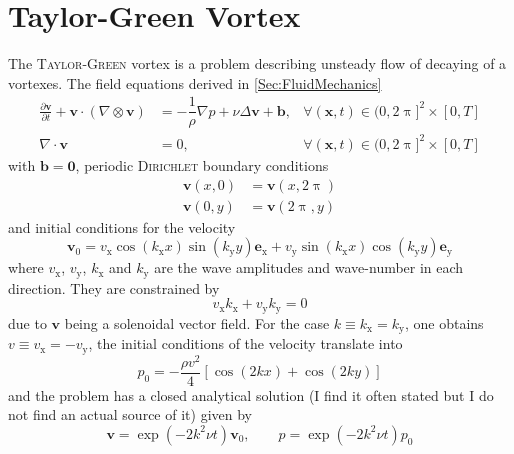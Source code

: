 \documentclass[]{scrartcl}
\newcommand{\pfrac}[2]{\frac{\partial #1}{\partial #2}}
\newcommand{\bs}[1]{\boldsymbol{#1}}
\begin{document}
\section{Taylor-Green Vortex}
The \textsc{Taylor-Green} vortex is a problem describing unsteady flow of decaying of a vortexes. The field equations derived in \cref{Sec:FluidMechanics}
\begin{equation*}
	\begin{aligned}
		\pfrac{\bs{v}}{t} + \bs{v} \cdot (\nabla \otimes \bs{v})&=  - \dfrac{1}{\rho}\nabla p + \nu \Delta \bs{v} + \bs{b}, &\forall (\bs{x}, t) \in (0,2\uppi]^2 \times \left[0, T \right] \\
		\nabla \cdot \bs{v}&= 0, &\forall (\bs{x}, t) \in (0,2\uppi]^2 \times  \left[0, T \right]
	\end{aligned}
\end{equation*}
with $\bs{b}=\bs{0}$, periodic \textsc{Dirichlet} boundary conditions
\begin{equation*}
	\begin{aligned}
		\bs{v}(x,0) &= \bs{v}(x, 2\uppi)\\
		\bs{v}(0,y) &= \bs{v}(2\uppi,y)
	\end{aligned}
\end{equation*}
and initial conditions for the velocity
\begin{equation*}
	\bs{v}_0 = v_\textrm{x} \cos( k_\textrm{x} x) \sin (k_\textrm{y} y) \bs{e}_\textrm{x} + 
			v_\textrm{y} \sin( k_\textrm{x} x) \cos (k_\textrm{y} y) \bs{e}_\textrm{y}
\end{equation*}
where $v_\textrm{x}$, $v_\textrm{y}$, $k_\textrm{x}$ and  $k_\textrm{y}$ are the wave amplitudes and wave-number in each direction. They are constrained by
\begin{equation*}
	v_\textrm{x}k_\textrm{x} + v_\textrm{y}k_\textrm{y} = 0
\end{equation*}
due to $\bs{v}$ being a solenoidal vector field. For the case $k\equiv k_\textrm{x}=k_\textrm{y}$, one obtains $v \equiv v_\textrm{x} = -v_\textrm{y}$, the initial conditions of the velocity translate into
\begin{equation*}
	p_0 = -\dfrac{\rho v^2}{4}\left[ \cos (2 k x) + \cos ( 2 k y)\right]
\end{equation*}
and the problem has a closed analytical solution (I find it often stated but I do not find an actual source of it) given by
\begin{equation*}
	\bs{v} = \exp (-2k^2 \nu t) \bs{v}_0,
	\qquad
	p = \exp (-2k^2 \nu t)p_0 
\end{equation*}
\end{document}
